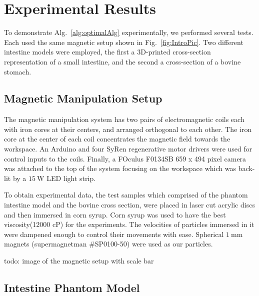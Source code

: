\section{Experimental Results}\label{sec:expResults}

To demonstrate Alg.~\ref{alg:optimalAlg} experimentally, we performed several tests.
Each used the same magnetic setup shown in Fig.~\ref{fig:IntroPic}.
 Two different intestine models were employed, the first a 3D-printed cross-section representation of a small intestine, and the second a cross-section of a bovine stomach.
 
 \subsection{Magnetic Manipulation Setup}
 
 The magnetic manipulation system has two pairs of electromagnetic coils each with iron cores at their centers, and arranged orthogonal to each other. The iron core at the center of each coil concentrates the magnetic field towards the workspace. An Arduino and four SyRen regenerative motor drivers were used for control inputs to the coils. Finally, a FOculus F0134SB 659 x 494 pixel camera was attached to the top of the system focusing on the workspace which was back-lit by a $\SI{15}{\watt}$ LED light strip. 
 
To obtain experimental data, the test samples which comprised of the phantom intestine model and the bovine cross section, were placed in laser cut acrylic discs and then immersed in corn syrup. Corn syrup was used to have the best viscosity(12000 cP) for the experiments. The velocities of particles immersed in it were dampened enough to control their movements with ease. Spherical $\SI{1}{\milli\metre}$ magnets (supermagnetman \#SP0100-50) were used as our particles.
 

todo: image of the magnetic setup with scale bar


\subsection{Intestine Phantom Model}

